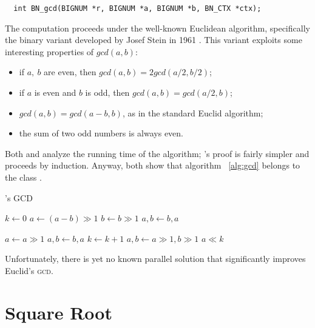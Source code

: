 \begin{verbatim}
  int BN_gcd(BIGNUM *r, BIGNUM *a, BIGNUM *b, BN_CTX *ctx);
\end{verbatim}

The computation proceeds under the well-known Euclidean algorithm, specifically
the binary variant developed by Josef Stein in 1961 \cite{AOCPv2}. This variant
exploits some interesting properties of $gcd(a, b)$:
\begin{itemize}
  \setlength{\itemsep}{1pt}
  \setlength{\parskip}{0pt}
  \setlength{\parsep}{0pt}
  \item if $a,\ b$ are even, then $gcd(a, b) = 2gcd(a/2, b/2)$;
  \item if $a$ is even and $b$ is odd, then $gcd(a, b) = gcd(a/2, b)$;
  \item  $gcd(a, b) = gcd(a-b, b)$, as in the standard Euclid algorithm;
  \item the sum of two odd numbers is always even.
\end{itemize}

Both \cite{AOCPv2} and \cite{MITalg} analyze the running time of the
algorithm; \cite{MITalg}'s proof is fairly simpler and proceeds %
by induction.
Anyway, both show that algorithm ~\ref{alg:gcd} belongs to the class
.

\begin{algorithm}[H]
  \caption{\openssl's GCD \label{alg:gcd}}
  \begin{algorithmic}[1]
    \State $k \gets 0$
          \State $a \gets (a-b) \gg 1$
        \Else
          \State $b \gets b \gg 1$
        \EndIf
         $a, b \gets b, a$ \EndIf

      \Else
          \State $a \gets a \gg 1$
           $a, b \gets b, a$ \EndIf
        \Else
          \State $k \gets k+1$
          \State $a, b \gets a \gg 1, b \gg 1$
        \EndIf
      \EndIf
    \EndWhile
    \State \Return $a \ll k$

  \end{algorithmic}
\end{algorithm}

Unfortunately, there is yet no known parallel solution that significantly improves
Euclid's \textsc{gcd}.


\section{Square Root \label{sec:preq:sqrt}}

